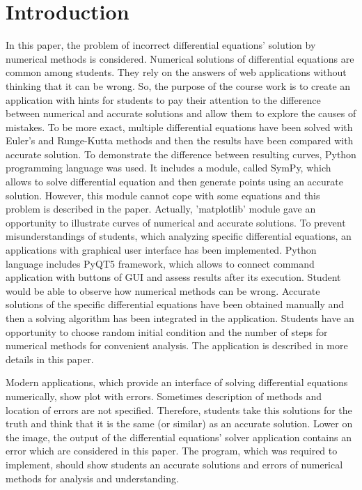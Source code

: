 \documentclass{article}
\begin{document}
\section{Introduction}
In this paper, the problem of incorrect differential equations' solution by numerical methods is considered. Numerical solutions of differential equations are common among students. They rely on the answers of web applications without thinking that it can be wrong. So, the purpose of the course work is to create an application with hints for students to pay their attention to the difference between numerical and accurate solutions and allow them to explore the causes of mistakes. To be more exact, multiple differential equations have been solved with Euler's and Runge-Kutta methods and then the results have been compared with accurate solution. To demonstrate the difference between resulting curves, Python programming language was used. It includes a module, called SymPy, which allows to solve differential equation and then generate points using an accurate solution. However, this module cannot cope with some equations and this problem is described in the paper. Actually, 'matplotlib' module gave an opportunity to illustrate curves of numerical and accurate solutions. To prevent misunderstandings of students, which analyzing specific differential equations, an applications with graphical user interface has been implemented. Python language includes PyQT5 framework, which allows to connect command application with buttons of GUI and assess results after its execution. Student would be able to observe how numerical methods can be wrong. Accurate solutions of the specific differential equations have been obtained manually and then a solving algorithm has been integrated in the application. Students have an opportunity to choose random initial condition and the number of steps for numerical methods for convenient analysis. The application is described in more details in this paper.
\par Modern applications, which provide an interface of solving differential equations numerically, show plot with errors. Sometimes description of methods and location of errors are not specified. Therefore, students take this solutions for the truth and think that it is the same (or similar) as an accurate solution. Lower on the image, the output of the differential equations' solver application contains an error which are considered in this paper. The program, which was required to implement, should show students an accurate solutions and errors of numerical methods for analysis and understanding.
\end{document}
